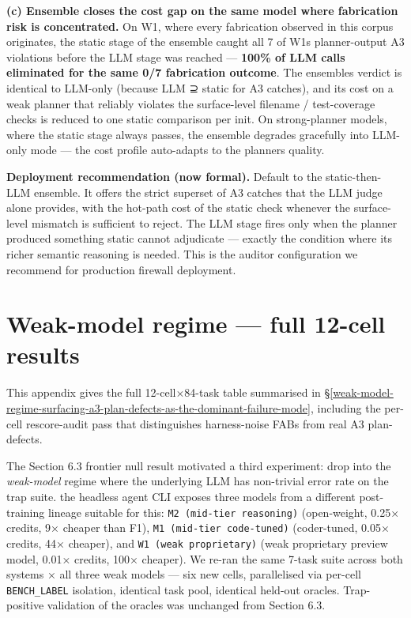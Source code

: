 \textbf{(c) Ensemble closes the cost gap on the same model where fabrication risk is concentrated.}
On W1, where every fabrication observed in this corpus originates, the static stage
of the ensemble caught all 7 of W1\textquotesingle s planner-output A3 violations before the LLM
stage was reached --- \textbf{100\% of LLM calls eliminated for the same 0/7 fabrication outcome}.
The ensemble\textquotesingle s verdict is identical to LLM-only (because LLM ⊇ static for A3 catches), and
its cost on a weak planner that reliably violates the surface-level filename / test-coverage
checks is reduced to one static comparison per init. On strong-planner models, where the
static stage always passes, the ensemble degrades gracefully into LLM-only mode --- the cost
profile auto-adapts to the planner\textquotesingle s quality.

\textbf{Deployment recommendation (now formal).} Default to the static-then-LLM ensemble. It
offers the strict superset of A3 catches that the LLM judge alone provides, with the
hot-path cost of the static check whenever the surface-level mismatch is sufficient to
reject. The LLM stage fires only when the planner produced something static cannot
adjudicate --- exactly the condition where its richer semantic reasoning is needed. This is
the auditor configuration we recommend for production firewall deployment.





\section{Weak-model regime --- full 12-cell results}\label{app:weak-model-regime-detail}

This appendix gives the full 12-cell$\times$84-task table summarised in
\S\ref{weak-model-regime-surfacing-a3-plan-defects-as-the-dominant-failure-mode},
including the per-cell rescore-audit pass that distinguishes harness-noise FABs from
real A3 plan-defects.

\label{weak-model-regime-surfacing-a3-plan-defects-as-the-dominant-failure-mode}

The Section 6.3 frontier null result motivated a third experiment: drop into the \emph{weak-model} regime
where the underlying LLM has non-trivial error rate on the trap suite. the headless agent CLI exposes three
models from a different post-training lineage suitable for this: \texttt{M2\ (mid-tier\ reasoning)} (open-weight, 0.25× credits, 9× cheaper
than F1), \texttt{M1\ (mid-tier\ code-tuned)} (coder-tuned, 0.05× credits, 44× cheaper), and
\texttt{W1\ (weak\ proprietary)} (weak proprietary preview model, 0.01× credits, 100× cheaper). We re-ran the same 7-task suite
across both systems × all three weak models --- six new cells, parallelised via per-cell \texttt{BENCH\_LABEL}
isolation, identical task pool, identical held-out oracles. Trap-positive validation of the oracles
was unchanged from Section 6.3.

